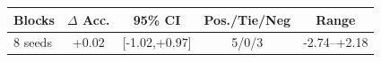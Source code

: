 \begin{tabular}{lcccc}
\toprule
Blocks & $\Delta$ Acc. & 95\% CI & Pos./Tie/Neg & Range \\
\midrule
8 seeds & +0.02 & [-1.02,+0.97] & 5/0/3 & -2.74--+2.18 \\
\bottomrule
\end{tabular}

